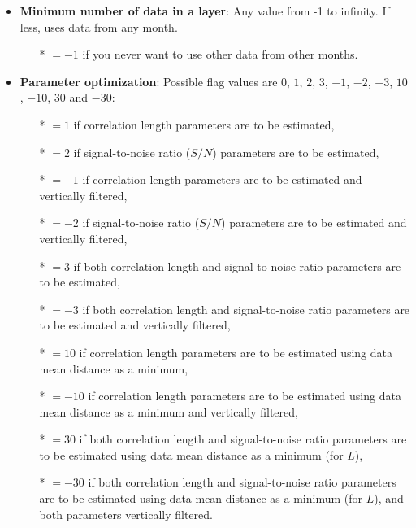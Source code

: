 \begin{itemize}
\item {\bf Minimum number of data in a layer}: Any value from -1 to infinity. If less, uses data from any month.
                \begin{itemize}
                \item[*] $=-1$ if you never want to use other data from other months.
                \end{itemize}
\item {\bf Parameter optimization}: Possible flag values are $0$, $1$, $2$, $3$, $-1$, $-2$, $-3$, $10$, $-10$, $30$ and $-30$:
              \begin{itemize}
                \item[*] $=1$ if correlation length parameters are to be estimated,
                \item[*] $=2$ if signal-to-noise ratio ($S/N$) parameters are to be estimated,
                \item[*] $=-1$ if correlation length parameters are to be estimated and vertically filtered,
                \item[*] $=-2$ if signal-to-noise ratio ($S/N$) parameters are to be estimated and vertically filtered,
                \item[*] $=3$ if both  correlation length and  signal-to-noise ratio parameters are to be estimated,
                \item[*] $=-3$ if both  correlation length and  signal-to-noise ratio parameters are to be estimated and vertically filtered,

                \item[*] $=10$ if correlation length parameters are to be estimated using data mean distance as a minimum,
                \item[*] $=-10$ if correlation length parameters are to be estimated using data mean distance as a minimum and vertically filtered,
                \item[*] $=30$ if both  correlation length and signal-to-noise ratio parameters are to be estimated using data mean distance as a minimum (for $L$),
                \item[*] $=-30$ if both  correlation length and signal-to-noise ratio parameters are to be estimated using data mean distance as a minimum (for $L$), and both parameters vertically filtered.
              \end{itemize}


\end{itemize}
